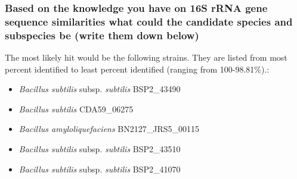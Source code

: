 \subsubsection*{Based on the knowledge you have on 16S rRNA gene sequence similarities what could the candidate species and subspecies be (write them down below)}
The most likely hit would be the following strains. They are listed from most percent identified to least percent identified (ranging from 100-98.81\%).:
\begin{itemize}
    \item \textit{Bacillus subtilis} subsp. \textit{subtilis} BSP2\_43490
    \item \textit{Bacillus subtilis} CDA59\_06275
    \item \textit{Bacillus amyloliquefaciens} BN2127\_JRS5\_00115
    \item \textit{Bacillus subtilis} subsp. \textit{subtilis} BSP2\_43510
    \item \textit{Bacillus subtilis} subsp. \textit{subtilis} BSP2\_41070
\end{itemize}